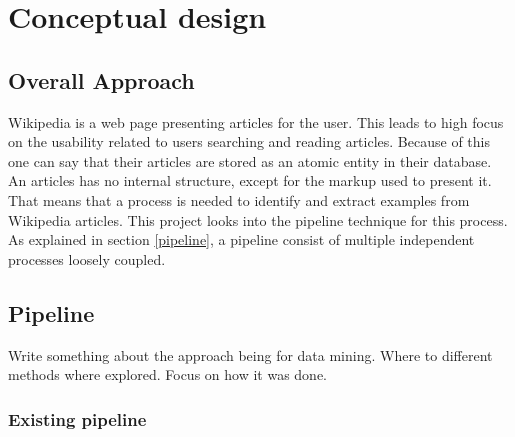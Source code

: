 
\chapter{Conceptual design}

\section{Overall Approach}

Wikipedia is a web page presenting articles for the user. This leads to high focus on the usability related to users searching and reading articles. Because of this one can say that their articles are stored as an atomic entity in their database. An articles has no internal structure, except for the markup used to present it. That means that a process is needed to identify and extract examples from Wikipedia articles. This 
project%
looks into the pipeline technique for this process. As explained in section \ref{pipeline}, a pipeline consist of multiple independent processes loosely coupled.\\



\section{Pipeline}

Write something about the approach being for data mining. Where to different methods where explored. Focus on how it was done.

\subsection{Existing pipeline} \label{smila}

